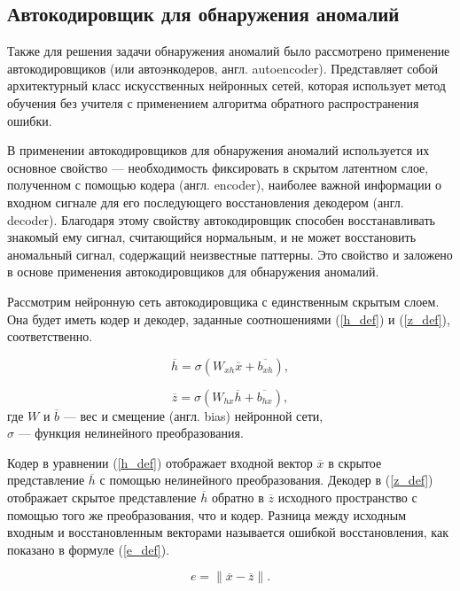 \subsection{Автокодировщик для обнаружения аномалий}

Также для решения задачи обнаружения аномалий было рассмотрено применение автокодировщиков (или автоэнкодеров, англ. autoencoder). Представляет собой архитектурный класс искусственных нейронных сетей, которая использует метод обучения без учителя с применением алгоритма обратного распространения ошибки.

В применении автокодировщиков для обнаружения аномалий используется их основное свойство --- необходимость фиксировать в скрытом латентном слое, полученном с помощью кодера (англ. encoder), наиболее важной информации о входном сигнале для его последующего восстановления декодером (англ. decoder). Благодаря этому свойству автокодировщик способен восстанавливать знакомый ему сигнал, считающийся нормальным, и не может восстановить аномальный сигнал, содержащий неизвестные паттерны. Это свойство и заложено в основе применения автокодировщиков для обнаружения аномалий.

Рассмотрим нейронную сеть автокодировщика с единственным скрытым слоем. Она будет иметь кодер и декодер, заданные соотношениями (\ref{h_def}) и (\ref{z_def}), соответственно.

\begin{equation}\label{h_def}
    \overline{h} = \sigma(W_{xh} \overline{x} + \overline{b_{xh}}),
\end{equation}

\begin{equation}\label{z_def}
    \overline{z} = \sigma(W_{hx}\overline{h} + \overline{b_{hx}}),
\end{equation}
где $W$ и $\overline{b}$ --- вес и смещение (англ. bias) нейронной сети, \\
$\sigma$ --- функция нелинейного преобразования.

Кодер в уравнении (\ref{h_def}) отображает входной вектор $\overline{x}$ в скрытое представление $\overline{h}$ с помощью нелинейного преобразования. Декодер в (\ref{z_def}) отображает скрытое представление $\overline{h}$ обратно в $\overline{z}$ исходного пространство с помощью того же преобразования, что и кодер. Разница между исходным входным и восстановленным векторами называется ошибкой восстановления, как показано в формуле (\ref{e_def}).

\begin{equation}\label{e_def}
    e =  \lVert \overline{x} - \overline{z} \rVert.
\end{equation}

